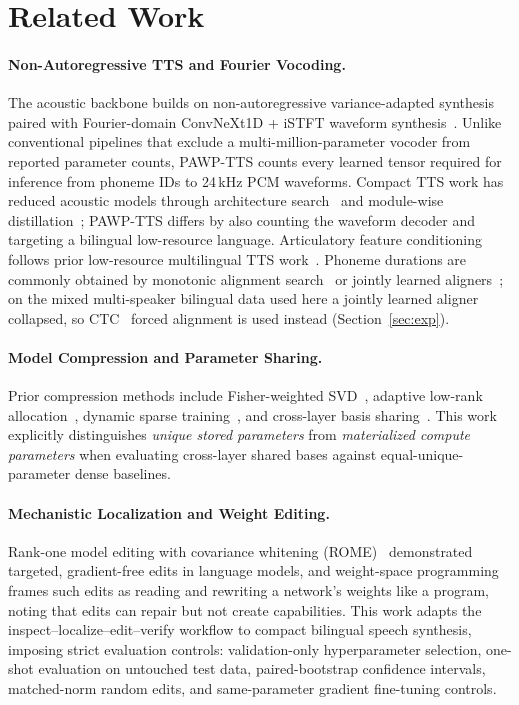 \section{Related Work}
\label{sec:related}

\paragraph{Non-Autoregressive TTS and Fourier Vocoding.}
The acoustic backbone builds on non-autoregressive variance-adapted synthesis~\cite{ren2021fastspeech2} paired with Fourier-domain ConvNeXt1D + iSTFT waveform synthesis~\cite{siuzdak2024vocos}. Unlike conventional pipelines that exclude a multi-million-parameter vocoder from reported parameter counts, PAWP-TTS counts every learned tensor required for inference from phoneme IDs to 24\,kHz PCM waveforms. Compact TTS work has reduced acoustic models through architecture search~\cite{luo2021lightspeech} and module-wise distillation~\cite{chevi2022nixtts}; PAWP-TTS differs by also counting the waveform decoder and targeting a bilingual low-resource language. Articulatory feature conditioning follows prior low-resource multilingual TTS work~\cite{lux2022toucan}. Phoneme durations are commonly obtained by monotonic alignment search~\cite{kim2020glowtts} or jointly learned aligners~\cite{badlani2022onealign}; on the mixed multi-speaker bilingual data used here a jointly learned aligner collapsed, so CTC~\cite{graves2006ctc} forced alignment is used instead (Section~\ref{sec:exp}).

\paragraph{Model Compression and Parameter Sharing.}
Prior compression methods include Fisher-weighted SVD~\cite{hsu2022fwsvd}, adaptive low-rank allocation~\cite{zhang2023adalora}, dynamic sparse training~\cite{evci2020rigl}, and cross-layer basis sharing~\cite{wang2025basissharing}. This work explicitly distinguishes \emph{unique stored parameters} from \emph{materialized compute parameters} when evaluating cross-layer shared bases against equal-unique-parameter dense baselines.

\paragraph{Mechanistic Localization and Weight Editing.}
Rank-one model editing with covariance whitening (ROME)~\cite{meng2022rome} demonstrated targeted, gradient-free edits in language models, and weight-space programming~\cite{wsp2026} frames such edits as reading and rewriting a network's weights like a program, noting that edits can repair but not create capabilities. This work adapts the inspect--localize--edit--verify workflow to compact bilingual speech synthesis, imposing strict evaluation controls: validation-only hyperparameter selection, one-shot evaluation on untouched test data, paired-bootstrap confidence intervals, matched-norm random edits, and same-parameter gradient fine-tuning controls.
